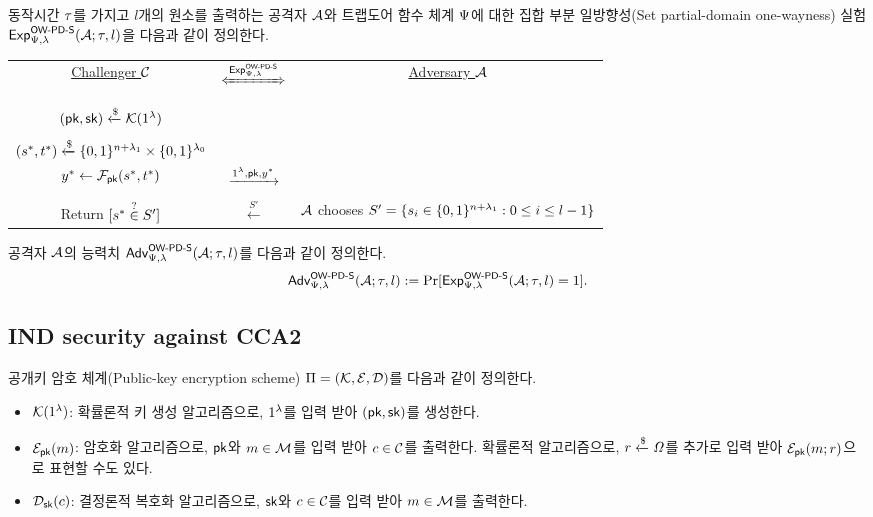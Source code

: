 \documentclass{article}
\theoremstyle{definition}
\begin{document}
동작시간 $\rt$를 가지고 $l$개의 원소를 출력하는 공격자 $\adv$와 트랩도어 함수
체계 $\tdsch$에 대한 집합 부분 일방향성(Set partial-domain one-wayness) 실험
$\Exp^{\owpds}_{\tdsch, \sp}(\adv; \rt, l)$을 다음과 같이 정의한다.
\begin{tcolorbox}[colback=white]
	\centering
	\begin{tabularx}{\linewidth}{CcC}
		\underline{Challenger $\ch$} & $\xLeftrightarrow{\Exp^{\owpds}_{\tdsch, \sp}}$ & \underline{Adversary $\adv$} \\
		\\
		$(\pk, \sk) \rgets \genkey(1^{\sp})$ & & \\
		\\
		$(s^*, t^*) \rgets \set{0, 1}^{\mlen + \sp_1} \times \set{0, 1}^{\sp_0}$ \\ $y^* \gets \td_{\pk}(s^*, t^*)$ & $\xrightarrow{1^{\sp}, \pk, y^*}$ & \\
		\\
		Return $[s^* \isin S']$ & $\xleftarrow{S'}$ & $\adv$ chooses $S' = \set{s_i \in \set{0, 1}^{\mlen + \sp_1}: 0 \le i \le l-1}$ \\
  \end{tabularx}
\end{tcolorbox}

공격자 $\adv$의 능력치 $\Adv^{\owpds}_{\tdsch, \sp}(\adv; \rt, l)$를 다음과 같이 정의한다.
$$
	\Adv^{\owpds}_{\tdsch, \sp}(\adv; \rt, l) := \Pr[\Exp^{\owpds}_{\tdsch, \sp}(\adv; \rt, l) = 1].
$$

\subsection{IND security against CCA2}

공개키 암호
체계(Public-key encryption scheme) $\sch = (\genkey, \enc, \dec)$를 다음과 같이
정의한다.
\begin{itemize}
	\item $\genkey(1^{\sp})$: 확률론적 키 생성 알고리즘으로, $1^{\sp}$를 입력
	받아 $(\pk, \sk)$를 생성한다.
	\item $\enc_{\pk}(\msg)$: 암호화 알고리즘으로, $\pk$와 $\msg \in
	\msgspace$를 입력 받아 $\ct \in \ctspace$를 출력한다. 확률론적 알고리즘으로,
	$\coin \rgets \coinspace$를 추가로 입력 받아 $\enc_{\pk}(\msg; \coin)$으로
	표현할 수도 있다.
	\item $\dec_{\sk}(\ct)$: 결정론적 복호화 알고리즘으로, $\sk$와 $\ct \in
	\ctspace$를 입력 받아 $\msg \in \msgspace$를 출력한다.
\end{itemize}
\end{document}
